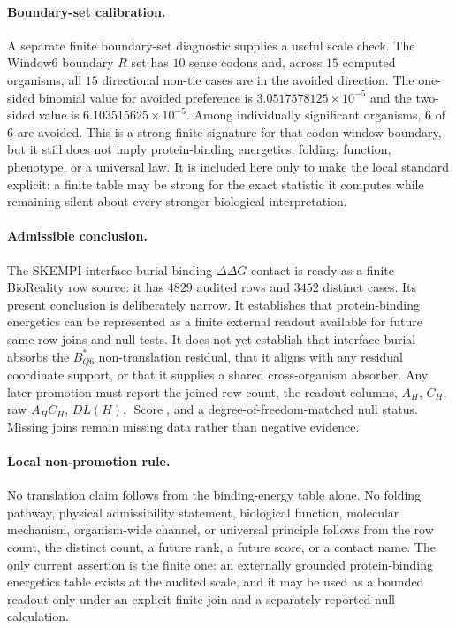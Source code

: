 \paragraph{Boundary-set calibration.}
A separate finite boundary-set diagnostic supplies a useful scale check.  The Window6 boundary $R$ set has $10$ sense codons and, across $15$ computed organisms, all $15$ directional non-tie cases are in the avoided direction.  The one-sided binomial value for avoided preference is $3.0517578125\times 10^{-5}$ and the two-sided value is $6.103515625\times 10^{-5}$.  Among individually significant organisms, $6$ of $6$ are avoided.  This is a strong finite signature for that codon-window boundary, but it still does not imply protein-binding energetics, folding, function, phenotype, or a universal law.  It is included here only to make the local standard explicit: a finite table may be strong for the exact statistic it computes while remaining silent about every stronger biological interpretation.

\paragraph{Admissible conclusion.}
The SKEMPI interface-burial binding-$\Delta\Delta G$ contact is ready as a finite BioReality row source: it has $4829$ audited rows and $3452$ distinct cases.  Its present conclusion is deliberately narrow.  It establishes that protein-binding energetics can be represented as a finite external readout available for future same-row joins and null tests.  It does not yet establish that interface burial absorbs the $B^*_{Q6}$ non-translation residual, that it aligns with any residual coordinate support, or that it supplies a shared cross-organism absorber.  Any later promotion must report the joined row count, the readout columns, $A_H$, $C_H$, raw $A_HC_H$, $DL(H)$, $\operatorname{Score}$, and a degree-of-freedom-matched null status.  Missing joins remain missing data rather than negative evidence.

\paragraph{Local non-promotion rule.}
No translation claim follows from the binding-energy table alone.  No folding pathway, physical admissibility statement, biological function, molecular mechanism, organism-wide channel, or universal principle follows from the row count, the distinct count, a future rank, a future score, or a contact name.  The only current assertion is the finite one: an externally grounded protein-binding energetics table exists at the audited scale, and it may be used as a bounded readout only under an explicit finite join and a separately reported null calculation.